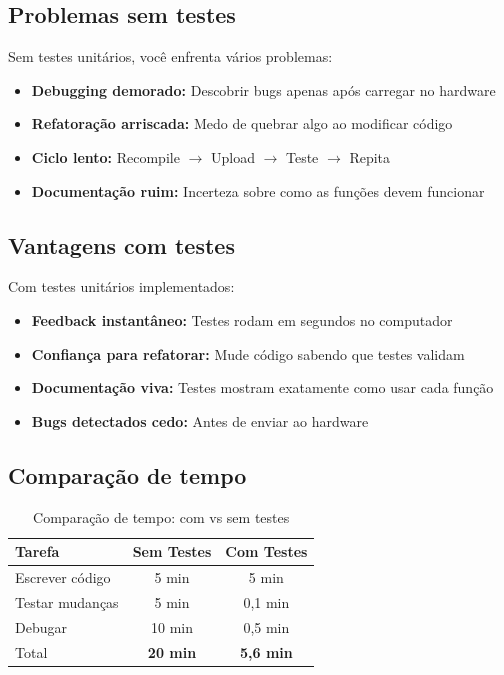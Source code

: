 \documentclass[12pt,a4paper]{article}
\begin{document}
\subsection{Problemas sem testes}

Sem testes unitários, você enfrenta vários problemas:

\begin{itemize}
    \item \textbf{Debugging demorado:} Descobrir bugs apenas após carregar no hardware
    \item \textbf{Refatoração arriscada:} Medo de quebrar algo ao modificar código
    \item \textbf{Ciclo lento:} Recompile $\rightarrow$ Upload $\rightarrow$ Teste $\rightarrow$ Repita
    \item \textbf{Documentação ruim:} Incerteza sobre como as funções devem funcionar
\end{itemize}

\subsection{Vantagens com testes}

Com testes unitários implementados:

\begin{itemize}
    \item \textbf{Feedback instantâneo:} Testes rodam em segundos no computador
    \item \textbf{Confiança para refatorar:} Mude código sabendo que testes validam
    \item \textbf{Documentação viva:} Testes mostram exatamente como usar cada função
    \item \textbf{Bugs detectados cedo:} Antes de enviar ao hardware
\end{itemize}

\subsection{Comparação de tempo}

\begin{table}[H]
\centering
\begin{tabular}{|l|c|c|}
\toprule
\textbf{Tarefa} & \textbf{Sem Testes} & \textbf{Com Testes} \\
\midrule
Escrever código & 5 min & 5 min \\
Testar mudanças & 5 min & 0,1 min \\
Debugar & 10 min & 0,5 min \\
Total & \textbf{20 min} & \textbf{5,6 min} \\
\bottomrule
\end{tabular}
\caption{Comparação de tempo: com vs sem testes}
\end{table}
\end{document}
